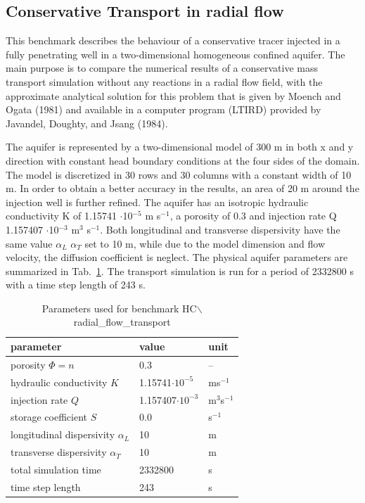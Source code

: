 \subsection{Conservative Transport in radial flow}

This benchmark describes the behaviour of a conservative tracer injected in a fully penetrating well in a two-dimensional homogeneous confined aquifer.
The main purpose is to compare the numerical results of a conservative mass transport simulation without
any reactions in a radial flow field, with the approximate analytical solution for this problem that is given by Moench and Ogata (1981) and available in a computer program (LTIRD) provided by Javandel, Doughty, and Jsang (1984).

The aquifer is represented by a two-dimensional model of 300 m in both x and y direction with constant head boundary conditions at the four sides of the domain. The model is discretized in 30 rows and 30 columns with a constant width of 10 m. In order to obtain a better accuracy in the results, an area of 20 m around the injection well is further refined. The aquifer has an isotropic hydraulic conductivity K of 1.15741 $\cdot$10$^{-5}$ m s$^{-1}$, a porosity of 0.3 and injection rate Q 1.157407 $\cdot$10$^{-3}$ m$^{3}$ s$^{-1}$. Both longitudinal and transverse dispersivity have the same value  $\alpha_L$ $\alpha_T$ set to 10 m, while due to the model dimension and flow velocity, the diffusion coefficient is neglect. The physical aquifer parameters are summarized in Tab.~\ref{l_tab_benchmark_tracer_radial_flow}. The transport simulation is run for a period of 2332800 s with a time step length of 243 s.

\begin{table}[htbp]
\caption{Parameters used for benchmark HC$\backslash$radial\_flow\_transport}
\centering
\begin{tabular}{|l|l|l|}
\hline
parameter & value & unit \\
\hline
porosity $\Phi = n $  & 0.3&  --  \\			
\hline
hydraulic conductivity $K$ & 1.15741$\cdot 10^{-5}$ & ms$^{-1}$ \\ 			
\hline
injection rate $Q $ & 1.157407$\cdot 10^{-3}$ & m$^3$s$^{-1}$ \\ 	 			
\hline
storage coefficient $S$ & 0.0 & s$^{-1}$ \\
\hline
longitudinal dispersivity $\alpha_L$ & 10 &  m \\
\hline
transverse dispersivity $\alpha_T$ & 10 & m \\
\hline
total simulation time & 2332800 & s  \\
\hline
time step length  & 243 & s \\
\hline
\end{tabular}
\label{l_tab_benchmark_tracer_radial_flow}
\end{table}

